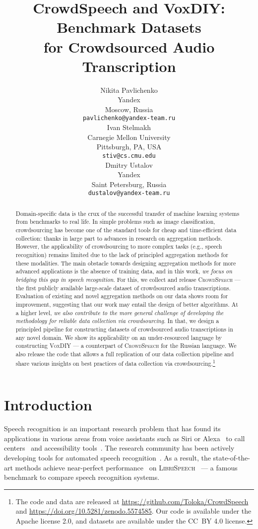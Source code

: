 \documentclass{article}
\title{CrowdSpeech and VoxDIY: Benchmark Datasets \\ for Crowdsourced Audio Transcription}
\author{Nikita Pavlichenko \\
  Yandex \\
  Moscow, Russia \\
  \texttt{pavlichenko@yandex-team.ru} \\
  \And
  Ivan Stelmakh \\
  Carnegie Mellon University \\
  Pittsburgh, PA, USA \\
  \texttt{stiv@cs.cmu.edu} \\
  \And
  Dmitry Ustalov \\
  Yandex \\
  Saint Petersburg, Russia \\
  \texttt{dustalov@yandex-team.ru} \\
}
\newcommand{\libri}{\textsc{LibriSpeech}}
\newcommand{\speech}{\textsc{CrowdSpeech}}
\newcommand{\vox}{\textsc{VoxDIY}}
\begin{document}
\maketitle

\begin{abstract}
Domain-specific data is the crux of the successful transfer of machine learning systems from benchmarks to real life. In simple problems such as image classification, crowdsourcing has become one of the standard tools for cheap and time-efficient data collection: thanks in large part to advances in research on aggregation methods. However, the applicability of crowdsourcing to more complex tasks  (e.g., speech recognition) remains limited due to the lack of principled aggregation methods for these modalities. The main obstacle towards designing aggregation methods for more advanced applications is the absence of training data, and in this work, \emph{we focus on bridging this gap in speech recognition}. For this, we collect and release \speech{} --- the first publicly available large-scale dataset of crowdsourced audio transcriptions. Evaluation of existing and novel aggregation methods on our data shows room for improvement, suggesting that our work may entail the design of better algorithms. At a higher level, \emph{we also contribute to the more general challenge of developing the methodology for reliable data collection via crowdsourcing}. In that, we design a principled pipeline for constructing datasets of crowdsourced audio transcriptions in any novel domain. We show its applicability on an under-resourced language by constructing \vox{} --- a counterpart of \speech{} for the Russian language. We also release the code that allows a full replication of our data collection pipeline and share various insights on best practices of data collection via crowdsourcing.\footnote{The code and data are released at \url{https://github.com/Toloka/CrowdSpeech} and \url{https://doi.org/10.5281/zenodo.5574585}. Our code is available under the Apache license 2.0, and datasets are available under the CC~BY 4.0 license.}
\end{abstract}

\section{Introduction}

Speech recognition is an important research problem that has found its applications in various areas from voice assistants such as Siri or Alexa~\citep{hoy18alexa} to call centers~\citep{neustein2010advances} and accessibility tools~\citep{bain05accessibility}. The research community has been actively developing tools for automated speech recognition~\citep[and many other works]{amodei15deep,hannun2014deep,Lamere03thecmu,lee09recent,liptchinsky17convnets,park19specaugment,Povey11thekaldi,synnaeve19endtoend,xu18neural, Young2006}. As a result, the state-of-the-art methods achieve near-perfect performance~\citep{zhang2020pushing} on \libri{}~\citep{panayotov15librispeech} --- a famous benchmark to compare speech recognition systems.
\end{document}
